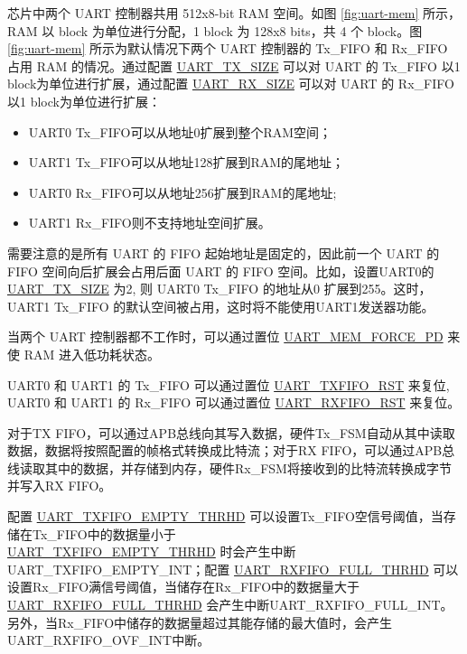 \documentclass[main\_\_CN.tex]{subfiles}
\begin{document}
芯片中两个 UART 控制器共用 512x8-bit RAM 空间。如图 \ref{fig:uart-mem} 所示，RAM 以 block 为单位进行分配，1 block 为 128x8 bits，共 4 个 block。图 \ref{fig:uart-mem} 所示为默认情况下两个 UART 控制器的 Tx\_FIFO 和 Rx\_FIFO 占用 RAM 的情况。通过配置 \hyperref[fielddesc:UARTTXSIZE]{UART\_TX\_SIZE} 可以对 UART 的 Tx\_FIFO 以1 block为单位进行扩展，通过配置 \hyperref[fielddesc:UARTRXSIZE]{UART\_RX\_SIZE} 可以对 UART 的 Rx\_FIFO 以1 block为单位进行扩展：
\begin{itemize}
    \item UART0 Tx\_FIFO可以从地址0扩展到整个RAM空间；
    \item UART1 Tx\_FIFO可以从地址128扩展到RAM的尾地址；
    \item UART0 Rx\_FIFO可以从地址256扩展到RAM的尾地址;
    \item UART1 Rx\_FIFO则不支持地址空间扩展。
\end{itemize}

需要注意的是所有 UART 的  FIFO 起始地址是固定的，因此前一个 UART 的 FIFO 空间向后扩展会占用后面 UART 的 FIFO 空间。比如，设置UART0的 \hyperref[fielddesc:UARTTXSIZE]{UART\_TX\_SIZE} 为2, 则 UART0 Tx\_FIFO 的地址从0 扩展到255。这时，UART1 Tx\_FIFO 的默认空间被占用，这时将不能使用UART1发送器功能。

当两个 UART 控制器都不工作时，可以通过置位 \hyperref[fielddesc:UARTMEMFORCEPD]{UART\_MEM\_FORCE\_PD} 来使 RAM 进入低功耗状态。

UART0 和 UART1 的 Tx\_FIFO 可以通过置位 \hyperref[fielddesc:UARTTXFIFORST]{UART\_TXFIFO\_RST} 来复位, UART0 和 UART1 的 Rx\_FIFO 可以通过置位 \hyperref[fielddesc:UARTRXFIFORST]{UART\_RXFIFO\_RST} 来复位。

对于TX FIFO，可以通过APB总线向其写入数据，硬件Tx\_FSM自动从其中读取数据，数据将按照配置的帧格式转换成比特流；对于RX FIFO，可以通过APB总线读取其中的数据，并存储到内存，硬件Rx\_FSM将接收到的比特流转换成字节并写入RX FIFO。

配置 \hyperref[fielddesc:UARTTXFIFOEMPTYTHRHD]{UART\_TXFIFO\_EMPTY\_THRHD} 可以设置Tx\_FIFO空信号阈值，当存储在Tx\_FIFO中的数据量小于 \\\hyperref[fielddesc:UARTTXFIFOEMPTYTHRHD]{UART\_TXFIFO\_EMPTY\_THRHD} 时会产生中断UART\_TXFIFO\_EMPTY\_INT；配置 \hyperref[fielddesc:UARTRXFIFOFULLTHRHD]{UART\_RXFIFO\_FULL\_THRHD} 可以设置Rx\_FIFO满信号阈值，当储存在Rx\_FIFO中的数据量大于 \hyperref[fielddesc:UARTRXFIFOFULLTHRHD]{UART\_RXFIFO\_FULL\_THRHD} 会产生中断UART\_RXFIFO\_FULL\_INT。另外，当Rx\_FIFO中储存的数据量超过其能存储的最大值时，会产生UART\_RXFIFO\_OVF\_INT中断。
\end{document}
